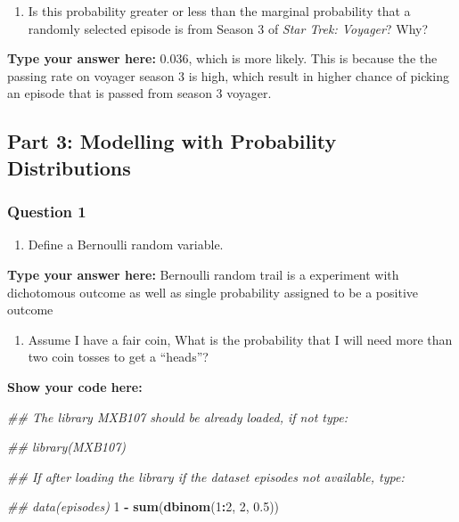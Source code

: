 \documentclass[
]{article}
\newenvironment{Shaded}{\begin{snugshade}}{\end{snugshade}}
\newcommand{\CommentTok}[1]{\textcolor[rgb]{0.56,0.35,0.01}{\textit{#1}}}
\newcommand{\DecValTok}[1]{\textcolor[rgb]{0.00,0.00,0.81}{#1}}
\newcommand{\FloatTok}[1]{\textcolor[rgb]{0.00,0.00,0.81}{#1}}
\newcommand{\KeywordTok}[1]{\textcolor[rgb]{0.13,0.29,0.53}{\textbf{#1}}}
\newcommand{\NormalTok}[1]{#1}
\newcommand{\OperatorTok}[1]{\textcolor[rgb]{0.81,0.36,0.00}{\textbf{#1}}}
\newcommand{\StringTok}[1]{\textcolor[rgb]{0.31,0.60,0.02}{#1}}
\providecommand{\tightlist}{%
  \setlength{\itemsep}{0pt}\setlength{\parskip}{0pt}}
\begin{document}
\begin{enumerate}
\def\labelenumi{\alph{enumi}.}
\setcounter{enumi}{2}
\tightlist
\item
  Is this probability greater or less than the marginal probability that
  a randomly selected episode is from Season 3 of \emph{Star Trek:
  Voyager}? Why?
\end{enumerate}

\textbf{Type your answer here:} 0.036, which is more likely. This is
because the the passing rate on voyager season 3 is high, which result
in higher chance of picking an episode that is passed from season 3
voyager.

\hypertarget{part-3-modelling-with-probability-distributions}{%
\subsection{Part 3: Modelling with Probability
Distributions}\label{part-3-modelling-with-probability-distributions}}

\hypertarget{question-1-2}{%
\subsubsection{Question 1}\label{question-1-2}}

\begin{enumerate}
\def\labelenumi{\alph{enumi}.}
\tightlist
\item
  Define a Bernoulli random variable.
\end{enumerate}

\textbf{Type your answer here:} Bernoulli random trail is a experiment
with dichotomous outcome as well as single probability assigned to be a
positive outcome

\begin{enumerate}
\def\labelenumi{\alph{enumi}.}
\setcounter{enumi}{1}
\tightlist
\item
  Assume I have a fair coin, What is the probability that I will need
  more than two coin tosses to get a ``heads''?
\end{enumerate}

\textbf{Show your code here:}

\begin{Shaded}
\begin{Highlighting}[]
\CommentTok{##  The library MXB107 should be already loaded, if not type:}

\CommentTok{##  library(MXB107)}

\CommentTok{##  If after loading the library if the dataset episodes not available, type:}

\CommentTok{##  data(episodes)}
\DecValTok{1} \OperatorTok{-}\StringTok{ }\KeywordTok{sum}\NormalTok{(}\KeywordTok{dbinom}\NormalTok{(}\DecValTok{1}\OperatorTok{:}\DecValTok{2}\NormalTok{, }\DecValTok{2}\NormalTok{, }\FloatTok{0.5}\NormalTok{))}
\end{Highlighting}
\end{Shaded}
\end{document}
